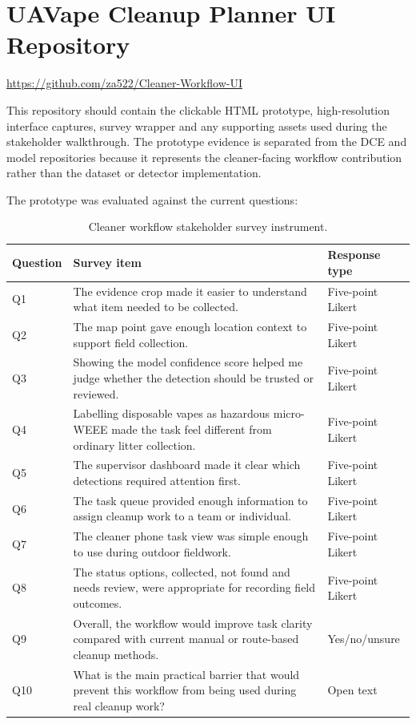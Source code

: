\section{UAVape Cleanup Planner UI Repository}
\label{app:cleanup_planner_repository}
\url{https://github.com/za522/Cleaner-Workflow-UI}

This repository should contain the clickable HTML prototype, high-resolution interface captures, survey wrapper and any supporting assets used during the stakeholder walkthrough. The prototype evidence is separated from the DCE and model repositories because it represents the cleaner-facing workflow contribution rather than the dataset or detector implementation.

The prototype was evaluated against the current questions:
\begin{table}[H]
\centering
\small
\begin{tabularx}{\textwidth}{p{} X p{}}
\toprule
\textbf{Question} & \textbf{Survey item} & \textbf{Response type} \\
\midrule
Q1 & The evidence crop made it easier to understand what item needed to be collected. & Five-point Likert \\
Q2 & The map point gave enough location context to support field collection. & Five-point Likert \\
Q3 & Showing the model confidence score helped me judge whether the detection should be trusted or reviewed. & Five-point Likert \\
Q4 & Labelling disposable vapes as hazardous micro-WEEE made the task feel different from ordinary litter collection. & Five-point Likert \\
Q5 & The supervisor dashboard made it clear which detections required attention first. & Five-point Likert \\
Q6 & The task queue provided enough information to assign cleanup work to a team or individual. & Five-point Likert \\
Q7 & The cleaner phone task view was simple enough to use during outdoor fieldwork. & Five-point Likert \\
Q8 & The status options, collected, not found and needs review, were appropriate for recording field outcomes. & Five-point Likert \\
Q9 & Overall, the workflow would improve task clarity compared with current manual or route-based cleanup methods. & Yes/no/unsure \\
Q10 & What is the main practical barrier that would prevent this workflow from being used during real cleanup work? & Open text \\
\bottomrule
\end{tabularx}
\caption{Cleaner workflow stakeholder survey instrument.}
\label{tab:appendix_cleaner_method_survey}
\end{table}

